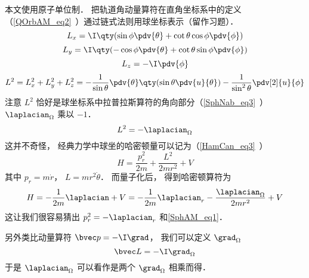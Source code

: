 

本文使用原子单位制． 把轨道角动量算符在直角坐标系中的定义（\autoref{QOrbAM_eq2}~）通过链式法则用球坐标表示（留作习题）．
\begin{equation}
L_x = \I \qty(\sin\phi\pdv{\theta} + \cot\theta\cos\phi\pdv{\phi})
\end{equation}
\begin{equation}
L_y = \I \qty(-\cos\phi\pdv{\theta} + \cot\theta \sin\phi \pdv{\phi})
\end{equation}
\begin{equation}
L_z = -\I\pdv{\phi}
\end{equation}
\begin{equation}
L^2 = L_x^2 + L_y^2 + L_z^2 = -\frac{1}{\sin\theta}\pdv{\theta} \qty(\sin \theta \pdv{u}{\theta}) - \frac{1}{\sin^2 \theta} \pdv[2]{u}{\phi}
\end{equation}
注意 $L^2$ 恰好是球坐标系中拉普拉斯算符的角向部分（\autoref{SphNab_eq3}~） $\laplacian_\Omega$ 乘以 $-1$．
\begin{equation}\label{SphAM_eq1}
L^2 = -\laplacian_\Omega
\end{equation}
这并不奇怪， 经典力学中球坐的哈密顿量可以记为（\autoref{HamCan_eq3}~）
\begin{equation}
H = \frac{p_r^2}{2m} + \frac{L^2}{2mr^2} + V
\end{equation}
其中 $p_r = m\dot r$， $L = mr^2\dot\theta$． 而量子化后， 得到哈密顿算符为
\begin{equation}
H = -\frac{1}{2m}\laplacian + V = -\frac{1}{2m}\laplacian_r -\frac{\laplacian_\Omega}{2mr^2} + V
\end{equation}
这让我们很容易猜出 $p_r^2 = -\laplacian_r$ 和\autoref{SphAM_eq1}．

另外类比动量算符 $\bvec p = -\I \grad$， 我们可以定义 $\grad_\Omega$
\begin{equation}
\bvec L = -\I \grad_\Omega
\end{equation}
于是 $\laplacian_\Omega$ 可以看作是两个 $\grad_\Omega$ 相乘而得．
